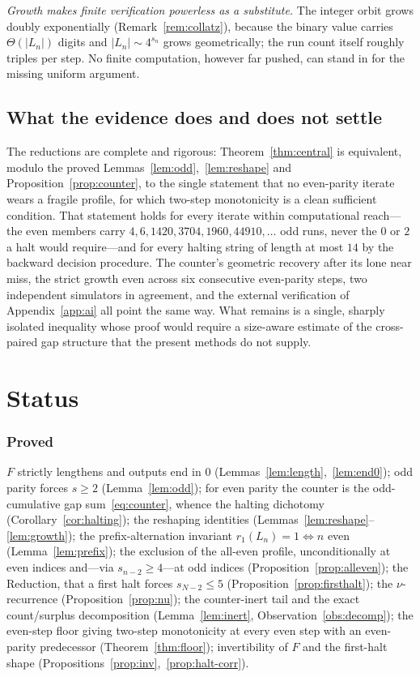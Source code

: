 \documentclass[11pt,reqno]{amsart}
\theoremstyle{plain}
\theoremstyle{definition}
\theoremstyle{remark}
\begin{document}
\emph{Growth makes finite verification powerless as a substitute.} The integer orbit grows doubly exponentially (Remark~\ref{rem:collatz}), because the binary value carries $\Theta(|L_n|)$ digits and $|L_n|\sim 4^{s_n}$ grows geometrically; the run count itself roughly triples per step. No finite computation, however far pushed, can stand in for the missing uniform argument.

\subsection{What the evidence does and does not settle}\label{sec:13.3}
The reductions are complete and rigorous: Theorem~\ref{thm:central} is equivalent, modulo the proved Lemmas~\ref{lem:odd},~\ref{lem:reshape} and Proposition~\ref{prop:counter}, to the single statement that no even-parity iterate wears a fragile profile, for which two-step monotonicity is a clean sufficient condition. That statement holds for every iterate within computational reach---the even members carry $4,6,1420,3704,1960,44910,\dots$ odd runs, never the $0$ or $2$ a halt would require---and for every halting string of length at most $14$ by the backward decision procedure. The counter's geometric recovery after its lone near miss, the strict growth even across six consecutive even-parity steps, two independent simulators in agreement, and the external verification of Appendix~\ref{app:ai} all point the same way. What remains is a single, sharply isolated inequality whose proof would require a size-aware estimate of the cross-paired gap structure that the present methods do not supply.

\section{Status}\label{sec:status}
\subsubsection*{Proved} $F$ strictly lengthens and outputs end in $0$ (Lemmas~\ref{lem:length},~\ref{lem:end0}); odd parity forces $s\ge 2$ (Lemma~\ref{lem:odd}); for even parity the counter is the odd-cumulative gap sum~\eqref{eq:counter}, whence the halting dichotomy (Corollary~\ref{cor:halting}); the reshaping identities (Lemmas~\ref{lem:reshape}--\ref{lem:growth}); the prefix-alternation invariant $r_1(L_n)=1\iff n$ even (Lemma~\ref{lem:prefix}); the exclusion of the all-even profile, unconditionally at even indices and---via $s_{n-2}\ge 4$---at odd indices (Proposition~\ref{prop:alleven}); the Reduction, that a first halt forces $s_{N-2}\le 5$ (Proposition~\ref{prop:firsthalt}); the $\nu$-recurrence (Proposition~\ref{prop:nu}); the counter-inert tail and the exact count/surplus decomposition (Lemma~\ref{lem:inert}, Observation~\ref{obs:decomp}); the even-step floor giving two-step monotonicity at every even step with an even-parity predecessor (Theorem~\ref{thm:floor}); invertibility of $F$ and the first-halt shape (Propositions~\ref{prop:inv},~\ref{prop:halt-corr}).
\end{document}
